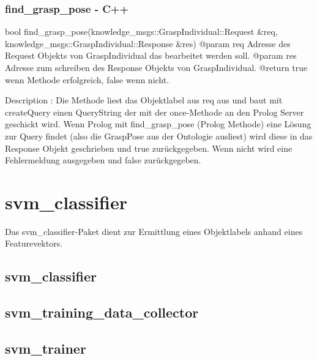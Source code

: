 \documentclass{suturo}
\begin{document}
\subsubsection{find\_grasp\_pose - C++}
\begin{spverbatim}
bool find_grasp_pose(knowledge_msgs::GraspIndividual::Request  &req, 
                             knowledge_msgs::GraspIndividual::Response &res)
@param req Adresse des Request Objekts von GraspIndividual das bearbeitet werden soll.
@param res Adresse zum schreiben des Response Objekts von GraspIndividual.
@return true wenn Methode erfolgreich, false wenn nicht.

Description : Die Methode liest das Objektlabel aus req aus und baut mit createQuery einen QueryString  der mit der once-Methode an den Prolog Server geschickt wird. Wenn Prolog mit find_grasp_pose (Prolog Methode) eine Lösung zur Query findet (also die GraspPose aus der Ontologie ausliest) wird diese in das Response Objekt 
geschrieben und true zurückgegeben. Wenn nicht wird eine Fehlermeldung ausgegeben und false zurückgegeben.
\end{spverbatim}

\section{svm\_classifier}
Das svm\_classifier-Paket dient zur Ermittlung eines Objektlabels anhand eines Featurevektors.

\subsection{svm\_classifier}
\begin{figure}[!htb]
\end{figure}

\subsection{svm\_training\_data\_collector}
\begin{figure}[!htb]
\end{figure}

\subsection{svm\_trainer}
\begin{figure}[!htb]
\end{figure}
      
\end{document}
